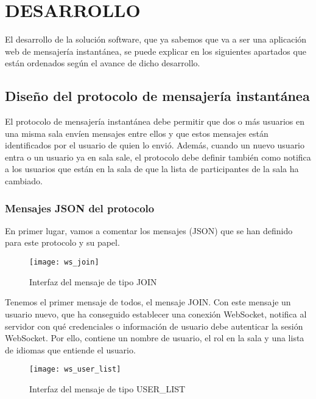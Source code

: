 \chapter{DESARROLLO\label{sec:desarrollo}}

\clearpage

El desarrollo de la solución software, que ya sabemos que va a ser una aplicación web de mensajería instantánea, se puede explicar en los siguientes apartados que están ordenados según el avance de dicho desarrollo.

\section{Diseño del protocolo de mensajería instantánea}

El protocolo de mensajería instantánea debe permitir que dos o más usuarios en una misma sala envíen mensajes entre ellos y que estos mensajes están identificados por el usuario de quien lo envió. Además, cuando un nuevo usuario entra o un usuario ya en sala sale, el protocolo debe definir también como notifica a los usuarios que están en la sala de que la lista de participantes de la sala ha cambiado.

\subsection{Mensajes JSON del protocolo}

En primer lugar, vamos a comentar los mensajes (JSON) que se han definido para este protocolo y su papel.

\begin{figure}[htp!]
  \centering
  \texttt{[image: ws\_join]}
  \caption{Interfaz del mensaje de tipo JOIN}
  \label{fig:ws_join}
\end{figure}

Tenemos el primer mensaje de todos, el mensaje JOIN. Con este mensaje un usuario nuevo, que ha conseguido establecer una conexión WebSocket, notifica al servidor con qué credenciales o información de usuario debe autenticar la sesión WebSocket. Por ello, contiene un nombre de usuario, el rol en la sala y una lista de idiomas que entiende el usuario.

\begin{figure}[htp!]
  \centering
  \texttt{[image: ws\_user\_list]}
  \caption{Interfaz del mensaje de tipo USER\_LIST}
  \label{fig:ws_user_list}
\end{figure}

